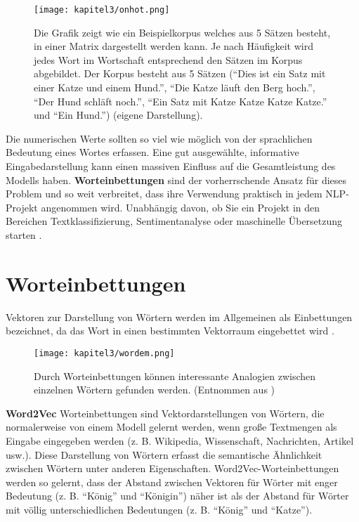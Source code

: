 \begin{figure}[H]
    \centering
    \texttt{[image: kapitel3/onhot.png]}
    \caption[One-Hot-Codierung als Eingabematrix]{Die Grafik zeigt wie ein Beispielkorpus welches aus 5 Sätzen besteht, in einer Matrix dargestellt werden kann. Je nach Häufigkeit wird jedes Wort im Wortschaft entsprechend den Sätzen im Korpus abgebildet. Der Korpus besteht aus 5 Sätzen (\enquote{Dies ist ein Satz mit einer Katze und einem Hund.}, \enquote{Die Katze läuft den Berg hoch.}, \enquote{Der Hund schläft noch.}, \enquote{Ein Satz mit Katze Katze Katze Katze.} und \enquote{Ein Hund.}) (eigene Darstellung).}
    \label{OneHotGrafik}
\end{figure}

Die numerischen Werte sollten so viel wie möglich von der sprachlichen Bedeutung eines Wortes erfassen. Eine gut ausgewählte, informative Eingabedarstellung kann einen massiven Einfluss auf die Gesamtleistung des Modells haben. \textbf{Worteinbettungen} sind der vorherrschende Ansatz für dieses Problem und so weit verbreitet, dass ihre Verwendung praktisch in jedem NLP-Projekt angenommen wird. Unabhängig davon, ob Sie ein Projekt in den Bereichen Textklassifizierung, Sentimentanalyse oder maschinelle Übersetzung starten \cite*{Lecun2015}.


\section{Worteinbettungen}
Vektoren zur Darstellung von Wörtern werden im Allgemeinen als Einbettungen bezeichnet, da das Wort in einen bestimmten Vektorraum eingebettet wird \cite*[99]{Jurafskya}.

\begin{figure}[H]
    \centering
    \texttt{[image: kapitel3/wordem.png]}
    \caption[Worteinbettungen erzeugen Analogien zwischen Wörtern]{Durch Worteinbettungen können interessante Analogien zwischen einzelnen Wörtern gefunden werden. (Entnommen aus \cite*{wordemdgood})}
    \label{Word2Vex}
\end{figure}


\textbf{Word2Vec} \cite*{Mikolov2013} Worteinbettungen sind Vektordarstellungen von Wörtern, die normalerweise von einem Modell gelernt werden, wenn große Textmengen als Eingabe eingegeben werden (z. B. Wikipedia, Wissenschaft, Nachrichten, Artikel usw.). Diese Darstellung von Wörtern erfasst die semantische Ähnlichkeit zwischen Wörtern unter anderen Eigenschaften. Word2Vec-Worteinbettungen werden so gelernt, dass der Abstand zwischen Vektoren für Wörter mit enger Bedeutung (z. B. \enquote{König} und \enquote{Königin}) näher ist als der Abstand für Wörter mit völlig unterschiedlichen Bedeutungen (z. B. \enquote{König} und \enquote{Katze}).

